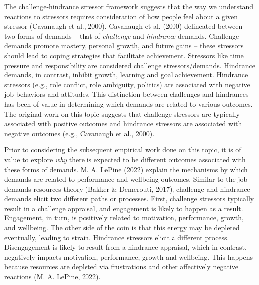 \documentclass[
  english,
  man]{apa6}
\begin{document}
The challenge-hindrance stressor framework suggests that the way we understand reactions to stressors requires consideration of how people feel about a given stressor (Cavanaugh et al., 2000). Cavanaugh et al. (2000) delineated between two forms of demands -- that of \emph{challenge} and \emph{hindrance} demands. Challenge demands promote mastery, personal growth, and future gains -- these stressors should lead to coping strategies that facilitate achievement. Stressors like time pressure and responsibility are considered challenge stressors/demands. Hindrance demands, in contrast, inhibit growth, learning and goal achievement. Hindrance stressors (e.g., role conflict, role ambiguity, politics) are associated with negative job behaviors and attitudes. This distinction between challenges and hindrances has been of value in determining which demands are related to various outcomes. The original work on this topic suggests that challenge stressors are typically associated with positive outcomes and hindrance stressors are associated with negative outcomes (e.g., Cavanaugh et al., 2000).

Prior to considering the subsequent empirical work done on this topic, it is of value to explore \emph{why} there is expected to be different outcomes associated with these forms of demands. M. A. LePine (2022) explain the mechanisms by which demands are related to performance and wellbeing outcomes. Similar to the job-demands resources theory (Bakker \& Demerouti, 2017), challenge and hindrance demands elicit two different paths or processes. First, challenge stressors typically result in a challenge appraisal, and engagement is likely to happen as a result. Engagement, in turn, is positively related to motivation, performance, growth, and wellbeing. The other side of the coin is that this energy may be depleted eventually, leading to strain. Hindrance stressors elicit a different process. Disengagement is likely to result from a hindrance appraisal, which in contrast, negatively impacts motivation, performance, growth and wellbeing. This happens because resources are depleted via frustrations and other affectively negative reactions (M. A. LePine, 2022).
\end{document}
